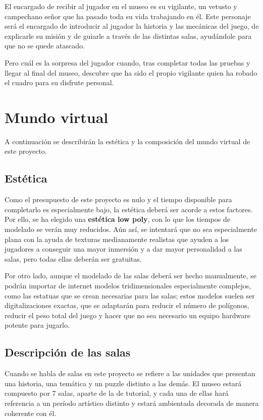El encargado de recibir al jugador en el museo es su vigilante, un vetusto y campechano señor que ha pasado toda su vida trabajando en él. Este personaje será el encargado de introducir al jugador la historia y las mecánicas del juego, de explicarle su misión y de guiarle a través de las distintas salas, ayudándole para que no se quede atascado.

Pero cuál es la sorpresa del jugador cuando, tras completar todas las pruebas y llegar al final del museo, descubre que ha sido el propio vigilante quien ha robado el cuadro para su disfrute personal.

\section{Mundo virtual}

A continuación se describirán la estética y la composición del mundo virtual de este proyecto.

\subsection{Estética}

Como el presupuesto de este proyecto es nulo y el tiempo disponible para completarlo es especialmente bajo, la estética deberá ser acorde a estos factores. Por ello, se ha elegido una \textbf{estética low poly}, con lo que los tiempos de modelado se verán muy reducidos. Aún así, se intentará que no sea especialmente plana con la ayuda de texturas medianamente realistas que ayuden a los jugadores a conseguir una mayor inmersión y a dar mayor personalidad a las salas, pero todas ellas deberán ser gratuitas.

Por otro lado, aunque el modelado de las salas deberá ser hecho manualmente, se podrán importar de internet modelos tridimensionales especialmente complejos, como las estatuas que se crean necesarias para las salas; estos modelos suelen ser digitalizaciones exactas, que se adaptarán para reducir el número de polígonos, reducir el peso total del juego y hacer que no sea necesario un equipo hardware potente para jugarlo.

\subsection{Descripción de las salas}

Cuando se habla de salas en este proyecto se refiere a las unidades que presentan una historia, una temática y un puzzle distinto a las demás. El museo estará compuesto por 7 salas, aparte de la de tutorial, y cada una de ellas hará referencia a un período artístico distinto y estará ambientada  decorada de manera coherente con él.

